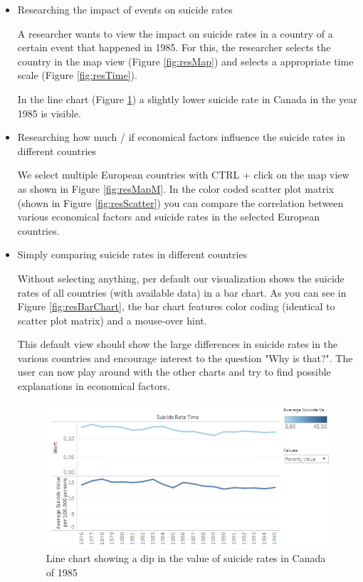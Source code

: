 \documentclass{vgtc}                          %
\begin{document}
\begin{itemize}
\item Researching the impact of events on suicide rates

A researcher wants to view the impact on suicide rates in a country of a certain event that happened in 1985. For this, the researcher selects the country in the map view (Figure \ref{fig:resMap}) and selects a appropriate time scale (Figure \ref{fig:resTime}).

In the line chart (Figure \ref{fig:resLine}) a slightly lower suicide rate in Canada in the year 1985 is visible.

\item Researching how much / if economical factors influence the suicide rates in different countries

We select multiple European countries with CTRL + click on the map view as shown in Figure \ref{fig:resMapM}. In the color coded scatter plot matrix (shown in Figure \ref{fig:resScatter}) you can compare the correlation between various economical factors and suicide rates in the selected European countries.

\item Simply comparing suicide rates in different countries

Without selecting anything, per default our visualization shows the suicide rates of all countries (with available data) in a bar chart. As you can see in Figure \ref{fig:resBarChart}, the bar chart features color coding (identical to scatter plot matrix) and a mouse-over hint.

This default view should show the large differences in suicide rates in the various countries and encourage interest to the question "Why is that?". The user can now play around with the other charts and try to find possible explanations in economical factors.

\begin{figure}[tb]
\centering
\includegraphics[width=\columnwidth]{image/chris/researcher01.png}
\caption{Line chart showing a dip in the value of suicide rates in Canada of 1985}
\label{fig:resLine} 
\end{figure}


\end{itemize}
\end{document}
